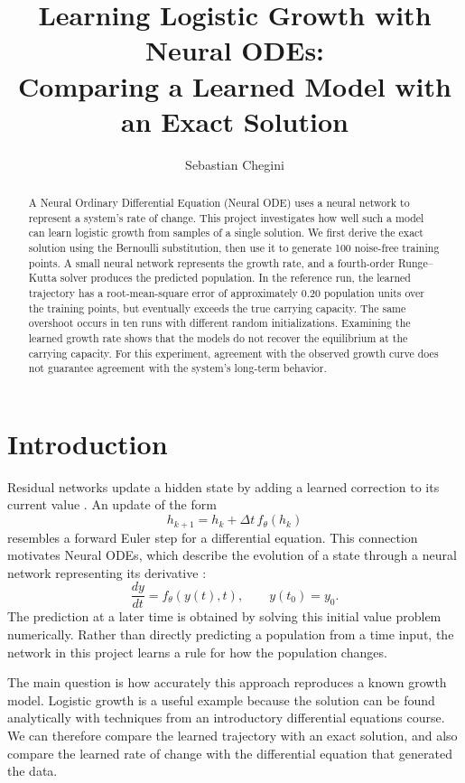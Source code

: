 \documentclass[11pt]{article}
\title{Learning Logistic Growth with Neural ODEs:\\
Comparing a Learned Model with an Exact Solution}
\author{Sebastian Chegini}
\date{}
\begin{document}
\maketitle

\begin{abstract}
A Neural Ordinary Differential Equation (Neural ODE) uses a neural network to
represent a system's rate of change. This project investigates how well such a
model can learn logistic growth from samples of a single solution. We first
derive the exact solution using the Bernoulli substitution, then use it to
generate 100 noise-free training points. A small neural network represents the
growth rate, and a fourth-order Runge--Kutta solver produces the predicted
population. In the reference run, the learned trajectory has a root-mean-square
error of approximately $0.20$ population units over the training points, but
eventually exceeds the true carrying capacity. The same overshoot occurs in
ten runs with different random initializations. Examining the learned growth
rate shows that the models do not recover the equilibrium at the carrying
capacity. For this experiment, agreement with the observed growth curve does
not guarantee agreement with the system's long-term behavior.
\end{abstract}

\section{Introduction}

Residual networks update a hidden state by adding a learned correction to its
current value \cite{he2016deep}. An update of the form
\[
 h_{k+1}=h_k+\Delta t\,f_\theta(h_k)
\]
resembles a forward Euler step for a differential equation. This connection
motivates Neural ODEs, which describe the evolution of a state through a
neural network representing its derivative \cite{chen2018neural}:
\begin{equation}
 \frac{dy}{dt}=f_\theta(y(t),t), \qquad y(t_0)=y_0.
 \label{eq:node}
\end{equation}
The prediction at a later time is obtained by solving this initial value
problem numerically. Rather than directly predicting a population from a time
input, the network in this project learns a rule for how the population changes.

The main question is how accurately this approach reproduces a known growth
model. Logistic growth is a useful example because the solution can be found
analytically with techniques from an introductory differential equations
course. We can therefore compare the learned trajectory with an exact solution,
and also compare the learned rate of change with the differential equation
that generated the data.
\end{document}
